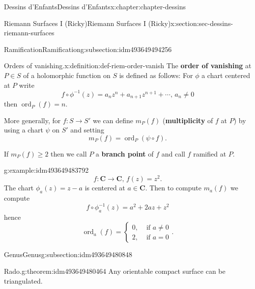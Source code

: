 \documentclass[oneside,10pt,]{book}
\newcommand{\terminology}[1]{\textbf{#1}}
\numberwithin{equation}{section}
\newcommand{\inv}{^{-1}}
\newcommand{\CC}{\mathbf{C}}
\DeclareMathOperator{\ord}{ord}
\newcommand{\amp}{&}
\begin{document}
\begin{chapterptx}{Dessins d'Enfants}{}{Dessins d'Enfants}{}{}{x:chapter:chapter-dessins}
\begin{sectionptx}{Riemann Surfaces I (Ricky)}{}{Riemann Surfaces I (Ricky)}{}{}{x:section:sec-dessins-riemann-surfaces}
\typeout{************************************************}
%
\begin{subsectionptx}{Ramification}{}{Ramification}{}{}{g:subsection:idm493649494256}
\begin{definition}{Orders of vanishing.}{x:definition:def-riem-order-vanish}%
The \terminology{order of vanishing} at \(P\in S\) of a holomorphic function on \(S\) is defined as follows: For \(\phi\) a  chart centered at \(P\) write%
\begin{equation*}
f\circ \phi\inv (z) = a_n z^n + a_{n+1}z^{n+1} + \cdots,\,a_n\ne 0
\end{equation*}
then \(\ord_P(f) = n\).%
\par
More generally, for \(f\colon S \to S'\) we can define \(m_P(f)\) (\terminology{multiplicity} of \(f\) at \(P\)) by using a chart \(\psi\) on \(S'\) and setting%
\begin{equation*}
m_P(f) = \ord_P(\psi\circ f)\text{.}
\end{equation*}
%
\par
If \(m_P(f)\ge 2\) then we call \(P\) a \terminology{branch point} of \(f\) and call \(f\) ramified at \(P\).%
\end{definition}
\begin{example}{}{g:example:idm493649483792}%
%
\begin{equation*}
f\colon \CC \to \CC,\,f(z) = z^2\text{.}
\end{equation*}
The chart \(\phi_a(z) = z-a\) is centered at \(a \in \CC\). Then to compute \(m_a(f)\) we compute%
\begin{equation*}
f\circ \phi\inv_a(z) = a^2 + 2az + z^2
\end{equation*}
hence%
\begin{equation*}
\ord_a(f) =\begin{cases} 0,\amp \text{ if } a\ne 0\\ 2,\amp\text{ if } a= 0\end{cases}\text{.}
\end{equation*}
%
\end{example}
\end{subsectionptx}
%
%
\typeout{************************************************}
\typeout{************************************************}
%
\begin{subsectionptx}{Genus}{}{Genus}{}{}{g:subsection:idm493649480848}
\begin{theorem}{Rado.}{}{g:theorem:idm493649480464}%
Any orientable compact surface can be triangulated.%

\end{theorem}
\end{subsectionptx}
\end{sectionptx}
\end{chapterptx}
\end{document}
